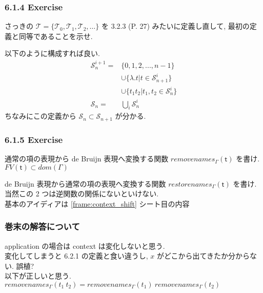 \documentclass[13pt,dvipdfm]{beamer}
\begin{document}
\frame
{
  \frametitle{6.1.4 Exercise}
  さっきの $\mathcal{T} = \{\mathcal{T}_0, \mathcal{T}_1, \mathcal{T}_2,\dots\}$
  を 3.2.3 (P. 27) みたいに定義し直して, 最初の定義と同等であることを示せ.

  以下のように構成すれば良い.
  \begin{align*}
    \mathcal{S}_n^{i+1} = &\{0, 1, 2,..., n-1\} \\
    &\cup \{\lambda.t | t \in \mathcal{S}_{n+1}^i \} \\
    &\cup \{t_1 t_2 | t_1, t_2 \in \mathcal{S}_n^i\} \\
    \mathcal{S}_n = &\bigcup_i \mathcal{S}_n^i
  \end{align*}
 ちなみにこの定義から $\mathcal{S}_n \subset \mathcal{S}_{n+1}$ が分かる.
}

\frame
{
}

\frame
{
  \frametitle{6.1.5 Exercise}
  通常の項の表現から de Bruijn 表現へ変換する関数 $removenames_\Gamma (\mathsf{t})$ を書け.
  $FV(\mathsf{t}) \subset dom(\Gamma)$

  de Bruijn 表現から通常の項の表現へ変換する関数 $restorenames_\Gamma (\mathsf{t})$ を書け.\\
  当然この 2 つは逆関数の関係にないといけない. \\
  基本のアイディアは \ref{frame:context_shift} シート目の内容
}

\frame
{
  \frametitle{巻末の解答について}
  application の場合は context は変化しないと思う.\\
  変化してしまうと 6.2.1 の定義と食い違うし, $x$ がどこから出てきたか分からない. 誤植? \\
  以下が正しいと思う.\\
  $removenames_\Gamma (t_1\ t_2) = removenames_\Gamma (t_1)\ removenames_\Gamma (t_2)$
}
\end{document}
